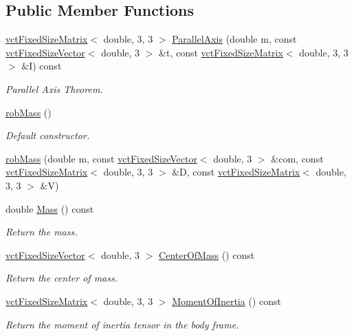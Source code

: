 \subsection*{Public Member Functions}
\begin{DoxyCompactItemize}
\item 
\hyperlink{classvct_fixed_size_matrix}{vct\-Fixed\-Size\-Matrix}$<$ double, 3, 3 $>$ \hyperlink{classrob_mass_a331a838101e66963b804b79ec03a7590}{Parallel\-Axis} (double m, const \hyperlink{classvct_fixed_size_vector}{vct\-Fixed\-Size\-Vector}$<$ double, 3 $>$ \&t, const \hyperlink{classvct_fixed_size_matrix}{vct\-Fixed\-Size\-Matrix}$<$ double, 3, 3 $>$ \&I) const 
\begin{DoxyCompactList}\small\item\em Parallel Axis Theorem. \end{DoxyCompactList}\item 
\hyperlink{classrob_mass_a2a6672b130620ef278f190db9ea8f916}{rob\-Mass} ()
\begin{DoxyCompactList}\small\item\em Default constructor. \end{DoxyCompactList}\item 
\hyperlink{classrob_mass_aecd46b1f11cf00af8f238a07018ecce1}{rob\-Mass} (double m, const \hyperlink{classvct_fixed_size_vector}{vct\-Fixed\-Size\-Vector}$<$ double, 3 $>$ \&com, const \hyperlink{classvct_fixed_size_matrix}{vct\-Fixed\-Size\-Matrix}$<$ double, 3, 3 $>$ \&D, const \hyperlink{classvct_fixed_size_matrix}{vct\-Fixed\-Size\-Matrix}$<$ double, 3, 3 $>$ \&V)
\item 
double \hyperlink{classrob_mass_a02b79738d557ca3959e047ce9e72d028}{Mass} () const 
\begin{DoxyCompactList}\small\item\em Return the mass. \end{DoxyCompactList}\item 
\hyperlink{classvct_fixed_size_vector}{vct\-Fixed\-Size\-Vector}$<$ double, 3 $>$ \hyperlink{classrob_mass_a96ba906f78fa4b0fbf3418b2c58af666}{Center\-Of\-Mass} () const 
\begin{DoxyCompactList}\small\item\em Return the center of mass. \end{DoxyCompactList}\item 
\hyperlink{classvct_fixed_size_matrix}{vct\-Fixed\-Size\-Matrix}$<$ double, 3, 3 $>$ \hyperlink{classrob_mass_af2696ac482e6385f11e7a39be637a57d}{Moment\-Of\-Inertia} () const 
\begin{DoxyCompactList}\small\item\em Return the moment of inertia tensor in the body frame. \end{DoxyCompactList}\item 

\end{DoxyCompactItemize}
